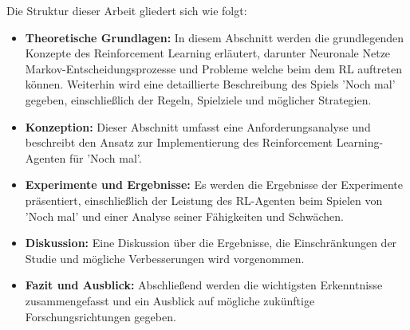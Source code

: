 Die Struktur dieser Arbeit gliedert sich wie folgt:
\begin{itemize}

    \item \textbf{Theoretische Grundlagen:} In diesem Abschnitt werden die grundlegenden Konzepte des Reinforcement Learning erläutert, darunter Neuronale Netze Markov-Entscheidungsprozesse und Probleme welche beim dem RL auftreten können. Weiterhin wird eine detaillierte Beschreibung des Spiels 'Noch mal' gegeben, einschließlich der Regeln, Spielziele und möglicher Strategien.
    \item \textbf{Konzeption:} Dieser Abschnitt umfasst eine Anforderungsanalyse und  beschreibt den Ansatz zur Implementierung des Reinforcement Learning-Agenten für 'Noch mal'. 
    \item \textbf{Experimente und Ergebnisse:} Es werden die Ergebnisse der Experimente präsentiert, einschließlich der Leistung des RL-Agenten beim Spielen von 'Noch mal' und einer Analyse seiner Fähigkeiten und Schwächen.
    \item \textbf{Diskussion:} Eine Diskussion über die Ergebnisse, die Einschränkungen der Studie und mögliche Verbesserungen wird vorgenommen.
    \item \textbf{Fazit und Ausblick:} Abschließend werden die wichtigsten Erkenntnisse zusammengefasst und ein Ausblick auf mögliche zukünftige Forschungsrichtungen gegeben.
\end{itemize}


